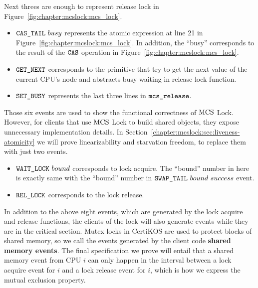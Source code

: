 Next threes are enough to represent release lock in Figure~\ref{fig:chapter:mcslock:mcs_lock}.

\begin{itemize}

\item \textbf{${\mathrm{\texttt{CAS\_TAIL}}}~{busy}$} represents the atomic expression at line 21  in Figure~\ref{fig:chapter:mcslock:mcs_lock}. 
In addition, the ``busy'' corresponds to the result of the ${\mathrm{\texttt{CAS}}}$ operation in Figure~\ref{fig:chapter:mcslock:mcs_lock}.

\item  \textbf{${\mathrm{\texttt{GET\_NEXT}}}$} corresponds to the primitive that try to get the next value of the current CPU's node and abstracts busy waiting in release lock function.

\item  \textbf{${\mathrm{\texttt{SET\_BUSY}}}$} represents the last three lines in ${\mathrm{\texttt{mcs\_release}}}$.
\end{itemize}

Those six events are used to show the functional correctness of
$\mathrm{MCS}$ Lock. However, for clients that use  $\mathrm{MCS}$ Lock to build shared
objects, they expose unnecessary implementation details.
In Section~\ref{chapter:mcslock:sec:liveness-atomicity} we will prove linearizability and
starvation freedom,  to replace them
with just two events.


\begin{itemize} 
\item \textbf{${\mathrm{\texttt{WAIT\_LOCK}}}~{bound}$} corresponds to lock acquire. The ``bound'' number in here is exactly same with the ``bound'' number in ${\mathrm{\texttt{SWAP\_TAIL}}}~{bound}~{success}$ event.

\item \textbf{${\mathrm{\texttt{REL\_LOCK}}}$} corresponds to the lock release.
\end{itemize}

In addition to the above eight events, which are generated by the lock
acquire and release functions, the clients of the lock will also
generate events while they are in the critical section. Mutex locks in
CertiKOS are used to protect blocks of shared memory, so we call the
events generated by the client code \textbf{shared memory events}. The
final specification we prove will entail that a shared memory event
from CPU $i$ can only happen in the interval between a lock acquire
event for $i$ and a lock release event for $i$, which is how we
express the mutual exclusion property.
